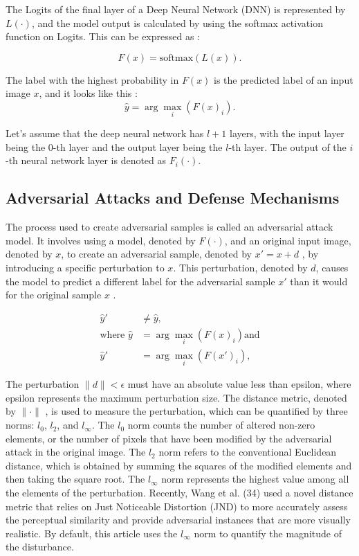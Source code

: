 \documentclass[10pt, conference, a4paper, final]{IEEEtran}
\begin{document}
The Logits of the final layer of a Deep Neural Network (DNN) is represented by \(L(\cdot)\), and the model output is calculated by using the softmax activation function on Logits. This can be expressed as \cite {ZhangS.}:

\begin{equation}
    F(x) = \text{softmax}(L(x)).
    \end{equation}

The label with the highest probability in \( F(x) \) is the predicted label of an input image \( x \), and it looks like this \cite {ZhangS.}: 
\begin{equation}
    \hat{y} = \arg\max_i (F(x)_i).
    \end{equation}

Let's assume that the deep neural network has \( l + 1 \) layers, with the input layer being the 0-th layer and the output layer being the \( l \)-th layer. The output of the \( i \)-th neural network layer is denoted as \( F_i(\cdot) \).

\subsection{Adversarial Attacks and Defense Mechanisms} 

The process used to create adversarial samples is called an adversarial attack model. It involves using a model, denoted by  \( F(\cdot) \), and an original input image, denoted by \( x \), to create an adversarial sample, denoted by \( x' = x + d \) , by introducing a specific perturbation to \( x \). This perturbation, denoted by \( d \), causes the model to predict a different label for the adversarial sample \( x' \) than it would for the original sample \( x \) \cite {ZhangS.}.

\begin{align}
    \hat{y}' &\neq \hat{y}, \\
    \text{where } \hat{y} &= \arg\max_i (F(x)_i) \text{and} \\
    \hat{y}'&= \arg\max_i (F(x')_i),
\end{align}

The perturbation \( \|d\| < \epsilon \) must have an absolute value less than epsilon, where epsilon represents the maximum perturbation size. The distance metric, denoted by  \( \|\cdot\| \) , is used to measure the perturbation, which can be quantified by three norms: \( l_0 \), \( l_2 \), and 
\( l_{\infty} \). The \( l_0 \) norm counts the number of altered non-zero elements, or the number of pixels that have been modified by the adversarial attack in the original image. The \( l_2 \) norm refers to the conventional Euclidean distance, which is obtained by summing the squares of the modified elements and then taking the square root. The \( l_{\infty} \) norm represents the highest value among all the elements of the perturbation. Recently, Wang et al. (34) used a novel distance metric that relies on Just Noticeable Distortion (JND) to more accurately assess the perceptual similarity and provide adversarial instances that are more visually realistic. By default, this article uses the 
\( l_{\infty} \) norm to quantify the magnitude of the disturbance.
\end{document}
